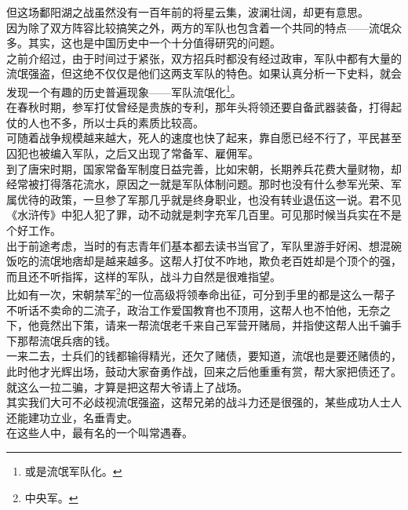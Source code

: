 \begin{multicols}{\theparacolNo}
但这场鄱阳湖之战虽然没有一百年前的将星云集，波澜壮阔，却更有意思。\\

因为除了双方阵容比较搞笑之外，两方的军队也包含着一个共同的特点——流氓众多。其实，这也是中国历史中一个十分值得研究的问题。\\

之前介绍过，由于时间过于紧张，双方招兵时都没有经过政审，军队中都有大量的流氓强盗，但这绝不仅仅是他们这两支军队的特色。如果认真分析一下史料，就会发现一个有趣的历史普遍现象——军队流氓化\footnote{或是流氓军队化。}。\\

在春秋时期，参军打仗曾经是贵族的专利，那年头将领还要自备武器装备，打得起仗的人也不多，所以士兵的素质比较高。\\

可随着战争规模越来越大，死人的速度也快了起来，靠自愿已经不行了，平民甚至囚犯也被编入军队，之后又出现了常备军、雇佣军。\\

到了唐宋时期，国家常备军制度日益完善，比如宋朝，长期养兵花费大量财物，却经常被打得落花流水，原因之一就是军队体制问题。那时也没有什么参军光荣、军属优待的政策，一旦参了军那几乎就是终身职业，也没有转业退伍这一说。君不见《水浒传》中犯人犯了罪，动不动就是刺字充军几百里。可见那时候当兵实在不是个好工作。\\

出于前途考虑，当时的有志青年们基本都去读书当官了，军队里游手好闲、想混碗饭吃的流氓地痞却是越来越多。这帮人打仗不咋地，欺负老百姓却是个顶个的强，而且还不听指挥，这样的军队，战斗力自然是很难指望。\\

比如有一次，宋朝禁军\footnote{中央军。}的一位高级将领奉命出征，可分到手里的都是这么一帮子不听话不卖命的二流子，政治工作爱国教育也不顶用，这帮人也不怕他，无奈之下，他竟然出下策，请来一帮流氓老千来自己军营开赌局，并指使这帮人出千骗手下那帮流氓兵痞的钱。\\

一来二去，士兵们的钱都输得精光，还欠了赌债，要知道，流氓也是要还赌债的，此时他才光辉出场，鼓动大家奋勇作战，回来之后他重重有赏，帮大家把债还了。\\

就这么一拉二骗，才算是把这帮大爷请上了战场。\\

其实我们大可不必歧视流氓强盗，这帮兄弟的战斗力还是很强的，某些成功人士人还能建功立业，名垂青史。\\

在这些人中，最有名的一个叫常遇春。\\


\end{multicols}
